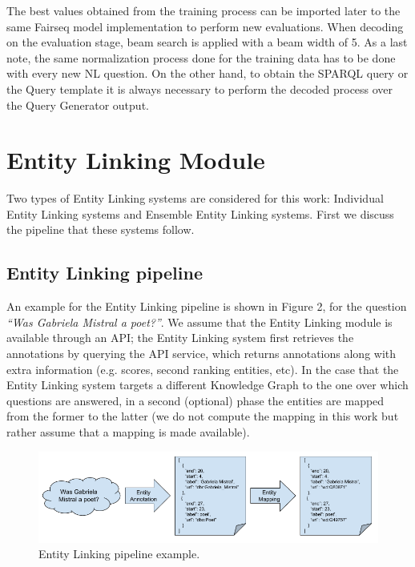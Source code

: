 The best values obtained from the training process can be imported later to the same Fairseq 
model implementation to perform new evaluations. When decoding on the evaluation stage, beam 
search is applied with a beam width of 5. As a last note, the same normalization process done 
for the training data has to be done with every new NL question. On the other hand, to obtain 
the SPARQL query or the Query template it is always necessary to perform the decoded process 
over the Query Generator output.

\section{Entity Linking Module}
\label{cap3:system/entLinModule}
Two types of Entity Linking systems are considered for this work: Individual Entity Linking 
systems and Ensemble Entity Linking systems. First we discuss the pipeline that these systems 
follow.

\subsection{Entity Linking pipeline}
\label{cap3:system/entLinModule/pipeline}
An example for the Entity Linking pipeline is shown in Figure 2, for the question \textit{“Was 
Gabriela Mistral a poet?”}. We assume that the Entity Linking module is available through an 
API; the Entity Linking system first retrieves the annotations by querying the API service, 
which returns annotations along with extra information (e.g. scores, second ranking entities, 
etc). In the case that the Entity Linking system targets a different Knowledge Graph to the one 
over which questions are answered, in a second (optional) phase the entities are mapped from 
the former to the latter (we do not compute the mapping in this work but rather assume that a 
mapping is made available).

\begin{figure}[!h]
    \centering
    \includegraphics[scale=.45]{imagenes/3_system_overview/entityLinkingPipeline.png}
    \caption{Entity Linking pipeline example.}
    \label{fig:entityLinkingPipeline}
\end{figure}


